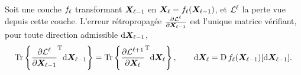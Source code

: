 
\begin{proposition}
\label{prop:spdnet-chainrule}
  Soit une couche $f_\ell$ transformant $\boldsymbol{X}_{\ell-1}$ en
  $\boldsymbol{X}_\ell=f_\ell(\boldsymbol{X}_{\ell-1})$, et $\mathcal{L}^{\ell}$ la
  perte vue depuis cette couche. L'erreur rétropropagée
  $\frac{\partial \mathcal{L}^{\ell}}{\partial \boldsymbol{X}_{\ell-1}}$ est l'unique matrice vérifiant,
  pour toute direction admissible $\mathrm{d}\boldsymbol{X}_{\ell-1}$,
  \begin{equation}
    \operatorname{\operatorname{Tr}}\left\{\frac{\partial \mathcal{L}^{\ell}}{\partial \boldsymbol{X}_{\ell-1}}^{\mathrm{T}}\mathrm{d}\boldsymbol{X}_{\ell-1}\right\}
    =
    \operatorname{\operatorname{Tr}}\left\{\frac{\partial \mathcal{L}^{\ell+1}}{\partial \boldsymbol{X}_{\ell}}^{\mathrm{T}}\mathrm{d}\boldsymbol{X}_{\ell}\right\},
    \qquad
    \mathrm{d}\boldsymbol{X}_\ell=\operatorname{\mathrm{D}}f_\ell(\boldsymbol{X}_{\ell-1})[\mathrm{d}\boldsymbol{X}_{\ell-1}].
    \label{eq:spdnet-chainrule}
  \end{equation}
\end{proposition}

